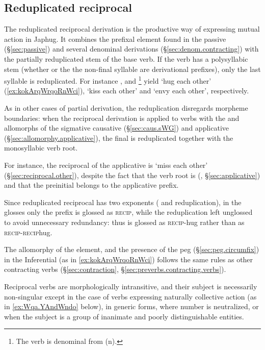 \subsection{Reduplicated reciprocal} \label{sec:redp.reciprocal}
The reduplicated reciprocal derivation is the productive way of expressing mutual action in Japhug. It combines the  prefixal element found in the passive (§\ref{sec:passive}) and several denominal derivations (§\ref{sec:denom.contracting}) with the partially reduplicated stem of the base verb. If the verb has a polysyllabic stem (whether or the the non-final syllable are derivational prefixes), only the last syllable is reduplicated. For instance ,   and \footnote{The verb  is denominal from  (n). } yield  `hug each other'  (\ref{ex:kokArqWrqoRnWci}),  `kiss each other' and  `envy each other', respectively. 

As in other cases of partial derivation, the reduplication disregards morpheme boundaries: when the reciprocal derivation is applied to verbs with the  and  allomorphs of the sigmative causative (§\ref{sec:caus.sWG}) and applicative (§\ref{sec:allomorphy.applicative}), the final  is reduplicated together with the monosyllabic verb root. 

For instance, the reciprocal of the applicative  is  `miss each other' (§\ref{sec:reciprocal.other}), despite the fact that the verb root is  (, §\ref{sec:applicative}) and that the preinitial  belongs to the applicative prefix. 

Since reduplicated reciprocal has two exponents ( and reduplication), in the glosses only the  prefix is glossed as \textsc{recip}, while the reduplication left unglossed to avoid unnecessary redundancy: thus  is glossed as \textsc{recip}-hug rather than as \textsc{recip}-\textsc{recip}\redp{}hug. 

The  allomorphy of the  element, and the presence of the peg  (§\ref{sec:peg.circumfix}) in the Inferential (as in \ref{ex:kokArqWrqoRnWci}) follows the same rules as other contracting verbs (§\ref{sec:contraction}, §\ref{sec:preverbs.contracting.verbs}).

Reciprocal verbs are morphologically intransitive, and their subject is necessarily non-singular except in the case of verbs expressing naturally collective action \citep[123--127]{kemmer93middle} (as in \ref{ex:Wqa.YAndWndo} below), in generic forms, where number is neutralized, or when the subject is a group of inanimate and poorly distinguishable entities. 

